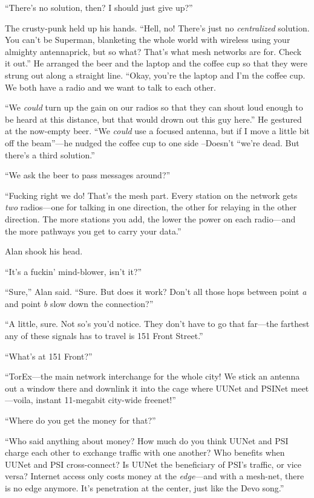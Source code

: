 ``There's no solution, then?  I should just give up?''

The crusty-punk held up his hands.  ``Hell, no!  There's just no
\textit{centralized} solution.  You can't be Superman, blanketing the
whole world with wireless using your almighty antennaprick, but so
what?  That's what mesh networks are for.  Check it out.'' He arranged
the beer and the laptop and the coffee cup so that they were strung
out along a straight line.  ``Okay, you're the laptop and I'm the
coffee cup.  We both have a radio and we want to talk to each other.

``We \textit{could} turn up the gain on our radios so that they can
shout loud enough to be heard at this distance, but that would drown
out this guy here.'' He gestured at the now-empty beer.  ``We
\textit{could} use a focused antenna, but if I move a little bit off
the beam''---he nudged the coffee cup to one side --Doesn't ``we're
dead.  But there's a third solution.''

``We ask the beer to pass messages around?''

``Fucking right we do!  That's the mesh part.  Every station on the
network gets \textit{two} radios---one for talking in one direction,
the other for relaying in the other direction.  The more stations you
add, the lower the power on each radio---and the more pathways you get
to carry your data.''

Alan shook his head.

``It's a fuckin' mind-blower, isn't it?''

``Sure,'' Alan said.  ``Sure.  But does it work?  Don't all those hops
between point \textit{a} and point \textit{b} slow down the
connection?''

``A little, sure.  Not so's you'd notice.  They don't have to go that
far---the farthest any of these signals has to travel is 151 Front
Street.''

``What's at 151 Front?''

``TorEx---the main network interchange for the whole city!  We stick
an antenna out a window there and downlink it into the cage where
UUNet and PSINet meet---voila, instant 11-megabit city-wide freenet!''

``Where do you get the money for that?''

``Who said anything about money?  How much do you think UUNet and PSI
charge each other to exchange traffic with one another?  Who benefits
when UUNet and PSI cross-connect?  Is UUNet the beneficiary of PSI's
traffic, or vice versa?  Internet access only costs money at the
\textit{edge}---and with a mesh-net, there is no edge anymore.  It's
penetration at the center, just like the Devo song.''

